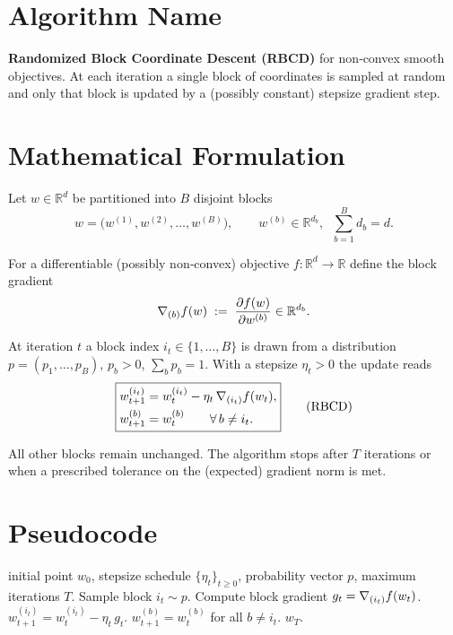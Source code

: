 \documentclass{article}
\newcommand{\grad}[1]{\nabla #1}
\begin{document}
\section*{Algorithm Name}
\textbf{Randomized Block Coordinate Descent (RBCD)} for non‑convex smooth objectives.  
At each iteration a single block of coordinates is sampled at random and only
that block is updated by a (possibly constant) stepsize gradient step.

\section*{Mathematical Formulation}
Let $w\in\mathbb{R}^{d}$ be partitioned into $B$ disjoint blocks
\[
w = \bigl(w^{(1)},w^{(2)},\dots ,w^{(B)}\bigr),\qquad 
w^{(b)}\in\mathbb{R}^{d_{b}},\;\;\sum_{b=1}^{B}d_{b}=d .
\]

For a differentiable (possibly non‑convex) objective $f:\mathbb{R}^{d}\to\mathbb{R}$
define the block gradient
\[
\grad_{(b)} f(w) \;:=\; \frac{\partial f(w)}{\partial w^{(b)}}\in\mathbb{R}^{d_{b}} .
\]

At iteration $t$ a block index $i_{t}\in\{1,\dots ,B\}$ is drawn from a
distribution $p=(p_{1},\dots ,p_{B})$, $p_{b}>0$, $\sum_{b}p_{b}=1$.
With a stepsize $\eta_{t}>0$ the update reads
\[
\boxed{
\begin{aligned}
w_{t+1}^{(i_{t})} &= w_{t}^{(i_{t})} - \eta_{t}\,\grad_{(i_{t})} f(w_{t}),\\
w_{t+1}^{(b)}   &= w_{t}^{(b)}\qquad\forall\,b\neq i_{t}.
\end{aligned}}
\tag{RBCD}
\]

All other blocks remain unchanged.  The algorithm stops after $T$ iterations
or when a prescribed tolerance on the (expected) gradient norm is met.

\section*{Pseudocode}
\begin{algorithm}[H]
\caption{Randomized Block Coordinate Descent}
\begin{algorithmic}[1]
 initial point $w_{0}$, stepsize schedule $\{\eta_{t}\}_{t\ge0}$,
probability vector $p$, maximum iterations $T$.
    \State Sample block $i_{t}\sim p$.
    \State Compute block gradient $g_{t}= \grad_{(i_{t})}f(w_{t})$.
    \State $w_{t+1}^{(i_{t})}= w_{t}^{(i_{t})}-\eta_{t}\, g_{t}$.
    \State $w_{t+1}^{(b)} = w_{t}^{(b)}$ for all $b\neq i_{t}$.
\EndFor
{} $w_{T}$.
\end{algorithmic}
\end{algorithm}
\end{document}
